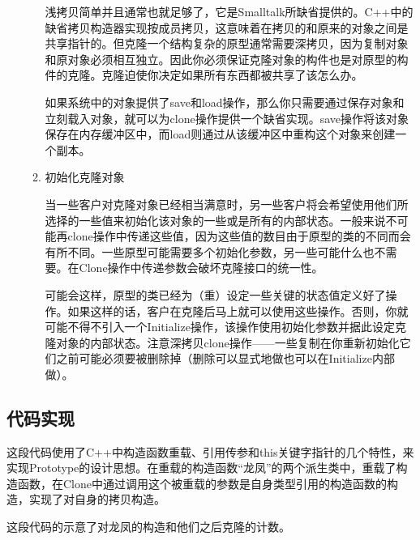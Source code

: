 \begin{enumerate}
\begin{enumerate}
	  浅拷贝简单并且通常也就足够了，它是Smalltalk所缺省提供的。C++中的缺省拷贝构造器实现按成员拷贝，这意味着在拷贝的和原来的对象之间是共享指针的。但克隆一个结构复杂的原型通常需要深拷贝，因为复制对象和原对象必须相互独立。因此你必须保证克隆对象的构件也是对原型的构件的克隆。克隆迫使你决定如果所有东西都被共享了该怎么办。

 	  如果系统中的对象提供了save和load操作，那么你只需要通过保存对象和立刻载入对象，就可以为clone操作提供一个缺省实现。save操作将该对象保存在内存缓冲区中，而load则通过从该缓冲区中重构这个对象来创建一个副本。

	  \item 初始化克隆对象

	  当一些客户对克隆对象已经相当满意时，另一些客户将会希望使用他们所选择的一些值来初始化该对象的一些或是所有的内部状态。一般来说不可能再clone操作中传递这些值，因为这些值的数目由于原型的类的不同而会有所不同。一些原型可能需要多个初始化参数，另一些可能什么也不需要。在Clone操作中传递参数会破坏克隆接口的统一性。

	  可能会这样，原型的类已经为（重）设定一些关键的状态值定义好了操作。如果这样的话，客户在克隆后马上就可以使用这些操作。否则，你就可能不得不引入一个Initialize操作，该操作使用初始化参数并据此设定克隆对象的内部状态。注意深拷贝clone操作——一些复制在你重新初始化它们之前可能必须要被删除掉（删除可以显式地做也可以在Initialize内部做）。

	  \end{enumerate}

\end{enumerate}

\subsection{代码实现}

这段代码使用了C++中构造函数重载、引用传参和this关键字指针的几个特性，来实现Prototype的设计思想。在重载的构造函数“龙凤”的两个派生类中，重载了构造函数，在Clone中通过调用这个被重载的参数是自身类型引用的构造函数的构造，实现了对自身的拷贝构造。

这段代码的示意了对龙凤的构造和他们之后克隆的计数。



